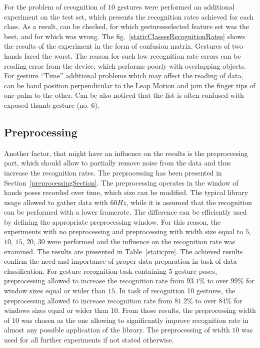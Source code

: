 For the problem of recognition of $10$ gestures were performed an additional experiment on the test set, which presents the recognition rates achieved for each class. As a result, can be checked, for which gesturesselected feature set was the best, and for which was wrong. The fig.~\ref{staticClassesRecognitionRates} shows the results of the experiment in the form of confusion matrix. Gestures of two hands fared the worst. The reason for such low recognition rate errors can be reading error from the device, which performs poorly with overlapping objects. For gesture ``Time'' additional problems which may affect the reading of data, can be hand position perpendicular to the Leap Motion and join the finger tips of one palm to the other. Can be also noticed that the fist is often confused with exposed thumb gesture (no. $6$).

\subsection{Preprocessing}

Another factor, that might have an influence on the results is the preprocessing part, which should allow to partially remove noise from the data and thus increase the recognition rates. 
The preprocessing has been presented in Section~\ref{preprocessingSection}.
The preprocessing operates in the window of hands poses recorded over time, which size can be modified. 
The typical library usage allowed to gather data with $60Hz$, while it is assumed that the recognition can be performed with a lower framerate. The difference can be efficiently used by defining the appropriate preprocessing window.
For this reason, the experiments with no preprocessing and preprocessing with width size equal to $5$, $10$, $15$, $20$, $30$ were performed and the influence on the recognition rate was examined.
The results are presented in Table~\ref{staticpre}.
The achieved results confirm the need and importance of proper data preparation in task of data classification.
For gesture recognition task containing $5$ gesture poses, preprocessing allowed to increase the recognition rate from $93.1\%$ to over $99\%$ for window sizes equal or wider than $15$. 
In task of recognition 10 gestures, the preprocessing allowed to increase recognition rate from $81.2\%$ to over $84\%$ for windows sizes equal or wider than $10$.
From those results, the preprocessing width of $10$ was chosen as the one allowing to significantly improve recognition rate in almost any possible application of the library.
The preprocessing of width $10$ was used for all further experiments if not stated otherwise.

